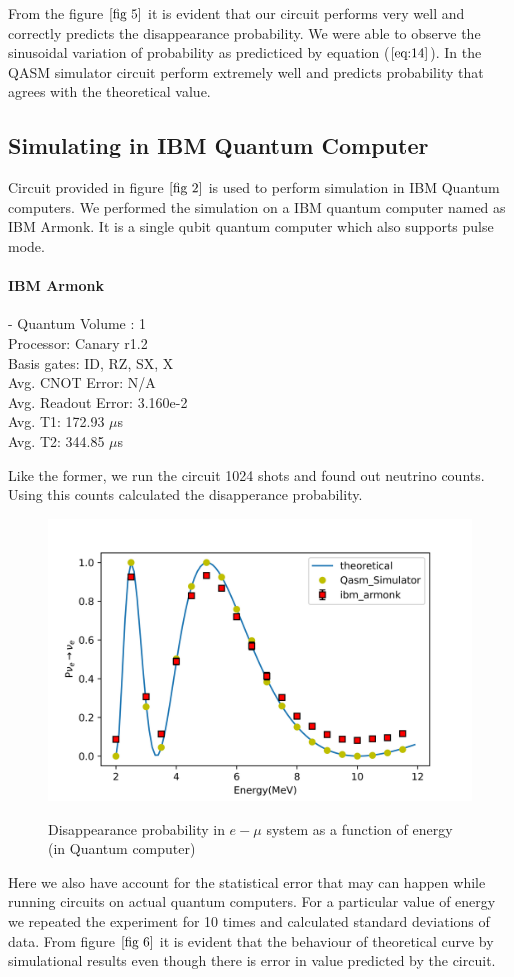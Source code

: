\documentclass[12pt,a4paper]{report}
\begin{document}
From the figure $\ref*{fig 5}$ it is evident that our circuit performs very well and correctly predicts the disappearance probability. We were able to observe the sinusoidal variation of probability as predicticed by equation ($\ref{eq:14}$). In the QASM simulator circuit perform extremely well and predicts probability that agrees with the theoretical value.
\subsection{Simulating in IBM Quantum Computer}
Circuit provided in figure $\ref{fig 2}$ is used to perform simulation in IBM Quantum computers. We performed the simulation on a IBM quantum computer named as IBM Armonk. It is a single qubit quantum computer which also supports pulse mode.
\paragraph{\textbf{IBM Armonk}} 
- Quantum Volume : 1\\
Processor: Canary r1.2\\
Basis gates: ID, RZ, SX, X\\
Avg. CNOT Error: N/A\\
Avg. Readout Error: 3.160e-2\\
Avg. T1: 172.93 $\mu$s\\
Avg. T2: 344.85 $\mu$s\par
Like the former, we run the circuit 1024 shots and found out neutrino counts. Using this counts calculated the disapperance probability. 
\begin{figure}[H]
	\graphicspath{ {./Images/} }
	\centering	
	{\includegraphics[scale=0.8]{fig_6.png}}
	\caption{Disappearance probability in $e-\mu$ system as a function of energy (in Quantum computer)}
	\label{fig 6}
\end{figure}\par
Here we also have account for the statistical error that may can happen while running circuits on actual quantum computers. For a particular value of energy we repeated the experiment for 10 times and calculated standard deviations of data. From figure $\ref{fig 6}$ it is evident that the behaviour of theoretical curve by simulational results even though there is error in value predicted by the circuit.
\pagebreak
\end{document}

